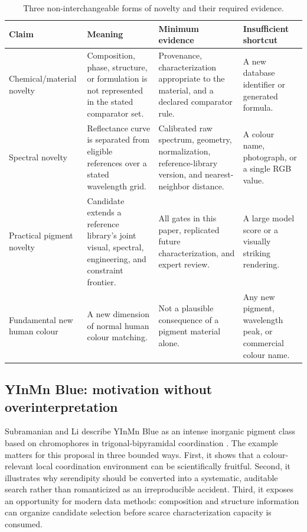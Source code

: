 \documentclass[conference]{IEEEtran}
\begin{document}
\begin{table}[!t]
\caption{Three non-interchangeable forms of novelty and their required evidence.}
\label{tab:novelty}
\centering
\renewcommand{\arraystretch}{1.25}
\begin{tabular}{|P{0.15\textwidth}|P{0.24\textwidth}|P{0.26\textwidth}|P{0.12\textwidth}|}
\hline
\textbf{Claim} & \textbf{Meaning} & \textbf{Minimum evidence} & \textbf{Insufficient shortcut} \\
\hline
Chemical/material novelty & Composition, phase, structure, or formulation is not represented in the stated comparator set. & Provenance, characterization appropriate to the material, and a declared comparator rule. & A new database identifier or generated formula. \\
\hline
Spectral novelty & Reflectance curve is separated from eligible references over a stated wavelength grid. & Calibrated raw spectrum, geometry, normalization, reference-library version, and nearest-neighbor distance. & A colour name, photograph, or a single RGB value. \\
\hline
Practical pigment novelty & Candidate extends a reference library's joint visual, spectral, engineering, and constraint frontier. & All gates in this paper, replicated future characterization, and expert review. & A large model score or a visually striking rendering. \\
\hline
Fundamental new human colour & A new dimension of normal human colour matching. & Not a plausible consequence of a pigment material alone. & Any new pigment, wavelength peak, or commercial colour name. \\
\hline
\end{tabular}
\end{table}

\subsection{YInMn Blue: motivation without overinterpretation}

Subramanian and Li describe YInMn Blue as an intense inorganic pigment class based on chromophores in trigonal-bipyramidal coordination \cite{yinmn}. The example matters for this proposal in three bounded ways. First, it shows that a colour-relevant local coordination environment can be scientifically fruitful. Second, it illustrates why serendipity should be converted into a systematic, auditable search rather than romanticized as an irreproducible accident. Third, it exposes an opportunity for modern data methods: composition and structure information can organize candidate selection before scarce characterization capacity is consumed.
\end{document}

